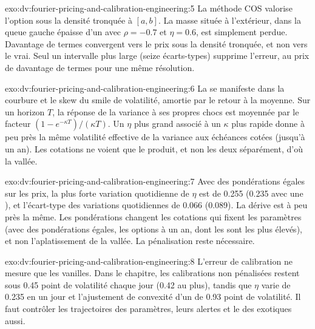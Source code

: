 \begin{solution}{exo:dv:fourier-pricing-and-calibration-engineering:5}
La méthode COS valorise l'option sous la densité tronquée à $[a,b]$. La masse située à l'extérieur, dans la queue gauche épaisse d'un  avec $\rho=-0.7$ et
$\eta=0.6$, est simplement perdue. Davantage de termes convergent vers le prix sous la densité tronquée, et non vers le vrai. Seul un intervalle plus large (seize
écarts-types) supprime l'erreur, au prix de davantage de termes pour une même résolution.
\end{solution}

\begin{solution}{exo:dv:fourier-pricing-and-calibration-engineering:6}
La  se manifeste dans la courbure et le skew du smile de volatilité, amortie par le retour à la moyenne. Sur un horizon $T$, la réponse de la variance à
ses propres chocs est moyennée par le facteur $(1-e^{-\kappa T})/(\kappa T)$. Un $\eta$ plus grand associé à un $\kappa$ plus rapide donne à peu près la même
volatilité effective de la variance aux échéances cotées (jusqu'à un an). Les cotations ne voient que le produit, et non les deux séparément, d'où la vallée.
\end{solution}

\begin{solution}{exo:dv:fourier-pricing-and-calibration-engineering:7}
Avec des pondérations égales sur les prix, la plus forte variation quotidienne de $\eta$ est de 0.255 (0.235 avec une ), et l'écart-type des variations quotidiennes de 0.066
(0.089). La dérive est à peu près la même. Les pondérations changent les cotations qui fixent les paramètres (avec des pondérations égales, les options à un an, dont les 
sont les plus élevés), et non l'aplatissement de la vallée. La pénalisation reste nécessaire.
\end{solution}

\begin{solution}{exo:dv:fourier-pricing-and-calibration-engineering:8}
L'erreur de calibration ne mesure que les vanilles. Dans le chapitre, les calibrations non pénalisées restent sous 0.45 point de volatilité chaque jour (0.42 au plus), tandis que
$\eta$ varie de 0.235 en un jour et l'ajustement de convexité d'un  de 0.93 point de volatilité. Il faut contrôler les trajectoires des paramètres, leurs alertes et
le  des exotiques aussi.
\end{solution}

